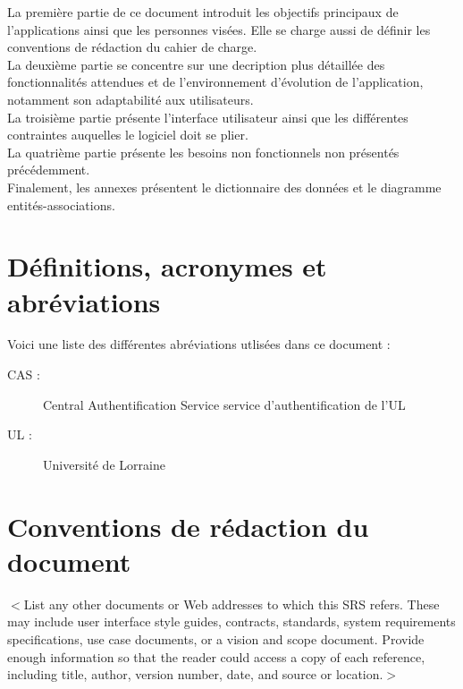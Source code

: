 \documentclass{scrreprt}
\begin{document}
\hspace{0.7cm}La première partie de ce document introduit les objectifs principaux de l'applications ainsi que les personnes visées. Elle se charge aussi de définir les conventions de rédaction du cahier de charge.\\

\hspace{0.7cm}La deuxième partie se concentre sur une decription plus détaillée des fonctionnalités attendues et de l'environnement d'évolution de l'application, notamment son adaptabilité aux utilisateurs.\\

\hspace{0.7cm}La troisième partie présente l'interface utilisateur ainsi que les différentes contraintes auquelles le logiciel doit se plier.\\

\hspace{0.7cm}La quatrième partie présente les besoins non fonctionnels non présentés précédemment.\\

\hspace{0.7cm}Finalement, les annexes présentent le dictionnaire des données et le diagramme entités-associations.

\section{Définitions, acronymes et abréviations}
\hspace{1cm}Voici une liste des différentes abréviations utlisées dans ce document :
\begin{description}
\item[CAS :] Central Authentification Service service d'authentification de l'UL
\item[UL :] Université de Lorraine
\end{description}

\section{Conventions de rédaction du document}
$<$List any other documents or Web addresses to which this SRS refers. These may 
include user interface style guides, contracts, standards, system requirements 
specifications, use case documents, or a vision and scope document. Provide 
enough information so that the reader could access a copy of each reference, 
including title, author, version number, date, and source or location.$>$
\end{document}
